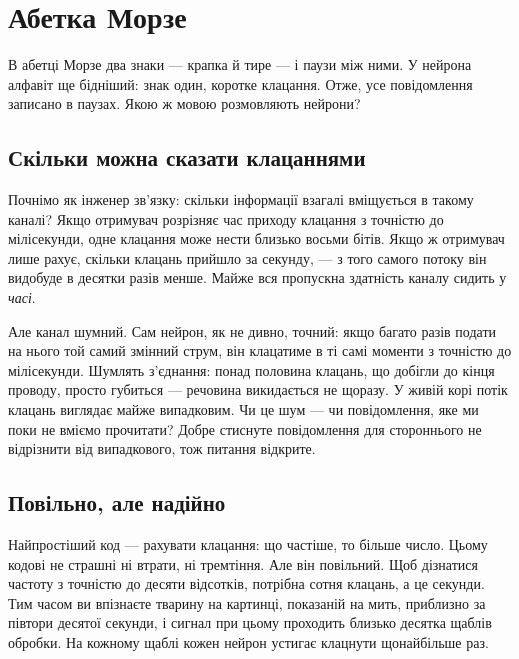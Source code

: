 \chapter{Абетка Морзе}

В абетці Морзе два знаки --- крапка й тире --- і паузи між ними. У нейрона алфавіт ще бідніший: знак один, коротке клацання. Отже, усе повідомлення записано в паузах. Якою ж мовою розмовляють нейрони?

\section*{Скільки можна сказати клацаннями}

Почнімо як інженер зв'язку: скільки інформації взагалі вміщується в такому каналі? Якщо отримувач розрізняє час приходу клацання з точністю до мілісекунди, одне клацання може нести близько восьми бітів. Якщо ж отримувач лише рахує, скільки клацань прийшло за секунду, --- з того самого потоку він видобуде в десятки разів менше. Майже вся пропускна здатність каналу сидить у \emph{часі}.


Але канал шумний. Сам нейрон, як не дивно, точний: якщо багато разів подати на нього той самий змінний струм, він клацатиме в ті самі моменти з точністю до мілісекунди. Шумлять з'єднання: понад половина клацань, що добігли до кінця проводу, просто губиться --- речовина викидається не щоразу. У живій корі потік клацань виглядає майже випадковим. Чи це шум --- чи повідомлення, яке ми поки не вміємо прочитати? Добре стиснуте повідомлення для стороннього не відрізнити від випадкового, тож питання відкрите.

\section*{Повільно, але надійно}

Найпростіший код --- рахувати клацання: що частіше, то більше число. Цьому кодові не страшні ні втрати, ні тремтіння. Але він повільний. Щоб дізнатися частоту з точністю до десяти відсотків, потрібна сотня клацань, а це секунди. Тим часом ви впізнаєте тварину на картинці, показаній на мить, приблизно за півтори десятої секунди, і сигнал при цьому проходить близько десятка щаблів обробки. На кожному щаблі кожен нейрон устигає клацнути щонайбільше раз.

